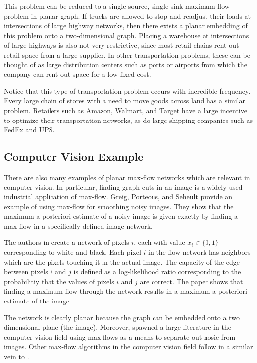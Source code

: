 \documentclass[12pt]{article}
\begin{document}
This problem can be reduced to a single source, single sink maximum flow problem in planar graph. If trucks are allowed to stop and readjust their loads at intersections of large highway networks, then there exists a planar embedding of this problem onto a two-dimensional graph. Placing a warehouse at intersections of large highways is also not very restrictive, since most retail chains rent out retail space from a large supplier. In other transportation problems, these can be thought of as large distribution centers such as ports or airports from which the company can rent out space for a low fixed cost. 

Notice that this type of transportation problem occurs with incredible frequency. Every large chain of stores with a need to move goods across land has a similar problem. Retailers such as Amazon, Walmart, and Target have a large incentive to optimize their transportation networks, as do large shipping companies such as FedEx and UPS. 

\subsection{Computer Vision Example}

There are also many examples of planar max-flow networks which are relevant in computer vision. In particular, finding graph cuts in an image is a widely used industrial application of max-flow. Greig, Porteous, and Seheult \cite{greigporteousseheult1989} provide an example of using max-flow for smoothing noisy images. They show that the maximum a posteriori estimate of a noisy image is given exactly by finding a max-flow in a specifically defined image network. 

The authors in \cite{greigporteousseheult1989} create a network of pixels $i$, each with value $x_i \in \{0,1\}$ corresponding to white and black. Each pixel $i$ in the flow network has neighbors which are the pixels touching it in the actual image. The capacity of the edge between pixels $i$ and $j$ is defined as a log-likelihood ratio corresponding to the probabilitiy that the values of pixels $i$ and $j$ are correct. The paper shows that finding a maximum flow through the network results in a maximum a posteriori estimate of the image. 

The network is clearly planar because the graph can be embedded onto a two dimensional plane (the image). Moreover, \cite{greigporteousseheult1989} spawned a large literature in the computer vision field using max-flows as a means to separate out nosie from images. Other max-flow algorithms in the computer vision field follow in a similar vein to \cite{greigporteousseheult1989}. 
\end{document}
